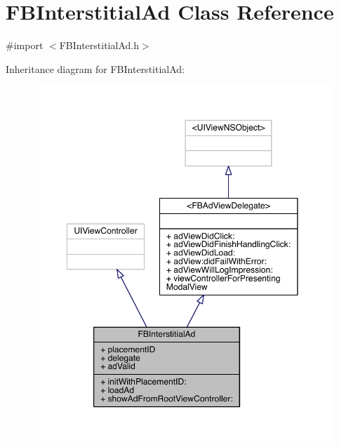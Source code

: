 \hypertarget{interface_f_b_interstitial_ad}{\section{F\-B\-Interstitial\-Ad Class Reference}
\label{interface_f_b_interstitial_ad}
}


{\ttfamily \#import $<$F\-B\-Interstitial\-Ad.\-h$>$}



Inheritance diagram for F\-B\-Interstitial\-Ad\-:
\nopagebreak
\begin{figure}[H]
\begin{center}
\leavevmode
\includegraphics[width=350pt]{interface_f_b_interstitial_ad__inherit__graph}
\end{center}
\end{figure}


